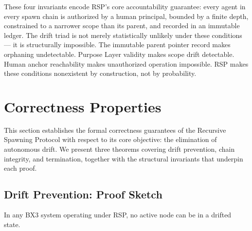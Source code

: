 \documentclass[12pt]{article}
\begin{document}
\bigskip
These four invariants encode RSP's core accountability guarantee: every agent in every spawn chain is authorized by a human principal, bounded by a finite depth, constrained to a narrower scope than its parent, and recorded in an immutable ledger. The drift triad is not merely statistically unlikely under these conditions — it is structurally impossible. The immutable parent pointer record makes orphaning undetectable. Purpose Layer validity makes scope drift detectable. Human anchor reachability makes unauthorized operation impossible. RSP makes these conditions nonexistent by construction, not by probability.\section{Correctness Properties}

This section establishes the formal correctness guarantees of the Recursive Spawning Protocol with respect to its core objective: the elimination of autonomous drift. We present three theorems covering drift prevention, chain integrity, and termination, together with the structural invariants that underpin each proof.

\subsection{Drift Prevention: Proof Sketch}

\begin{thrm}
\label{thrm:drift-prevention}
In any BX3 system operating under RSP, no active node can be in a drifted state.
\end{thrm}
\end{document}
